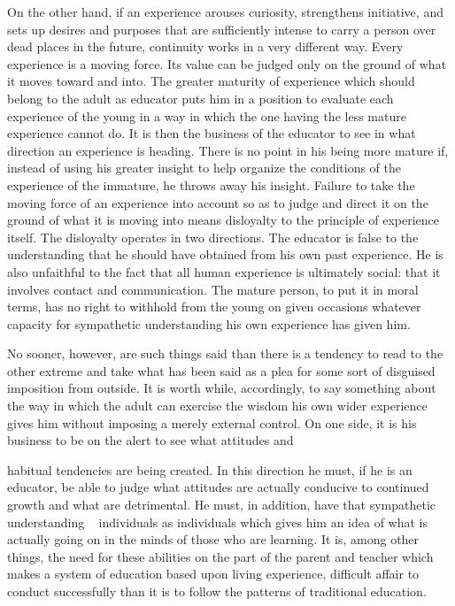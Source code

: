 On the other hand, if an experience arouses curiosity, strengthens initiative, and sets 
up desires and purposes that are sufficiently intense to carry a person over dead places in 
the future, continuity works in a very different way. Every experience is a moving force. 
Its value can be judged only on the ground of what it moves toward and into. The greater 
maturity of experience which should belong to the adult as educator puts him in a 
position to evaluate each experience of the young in a way in which the one having the 
less mature experience cannot do. It is then the business of the educator to see in what 
direction an experience is heading. There is no point in his being more mature if, instead 
of using his greater insight to help organize the conditions of the experience of the 
immature, he throws away his insight. Failure to take the moving force of an experience 
into account so as to judge and direct it on the ground of what it is moving into means 
disloyalty to the principle of experience itself. The disloyalty operates in two directions. 
The educator is false to the understanding that he should have obtained from his own past 
experience. He is also unfaithful to the fact that all human experience is ultimately social: 
that it involves contact and communication. The mature person, to put it in moral terms, 
has no right to withhold from the young on given occasions whatever capacity for 
sympathetic understanding his own experience has given him. 

No sooner, however, are such things said than there is a tendency to read to the other 
extreme and take what has been said as a plea for some sort of disguised imposition from 
outside. It is worth while, accordingly, to say something about the way in which the adult 
can exercise the wisdom his own wider experience gives him without imposing a merely 
external control. On one side, it is his business to be on the alert to see what attitudes and 



habitual tendencies are being created. In this direction he must, if he is an educator, be 
able to judge what attitudes are actually conducive to continued growth and what are 
detrimental. He must, in addition, have that sympathetic understanding ~ individuals as 
individuals which gives him an idea of what is actually going on in the minds of those 
who are learning. It is, among other things, the need for these abilities on the part of the 
parent and teacher which makes a system of education based upon living experience, 
difficult affair to conduct successfully than it is to follow the patterns of traditional 
education. 

